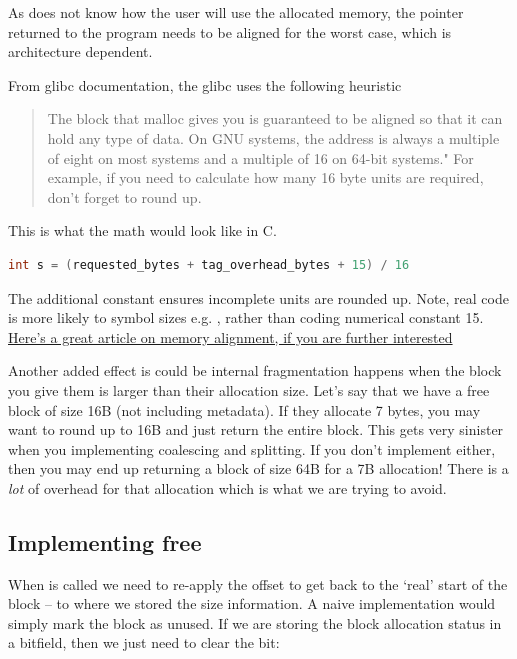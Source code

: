 As  does not know how the user will use the allocated memory, the pointer returned to the program needs to be aligned for the worst case, which is architecture dependent.

From glibc documentation, the glibc  uses the following heuristic \cite{vma_paging}

\begin{quote}
The block that malloc gives you is guaranteed to be aligned so that it can hold any type of data. On GNU systems, the address is always a multiple of eight on most systems and a multiple of 16 on 64-bit systems." For example, if you need to calculate how many 16 byte units are required, don't forget to round up.
\end{quote}

This is what the math would look like in C.

\begin{lstlisting}[language=C]
int s = (requested_bytes + tag_overhead_bytes + 15) / 16
\end{lstlisting}

The additional constant ensures incomplete units are rounded up. Note, real code is more likely to symbol sizes e.g. , rather than coding numerical constant 15.
\href{http://www.ibm.com/developerworks/library/pa-dalign/}{Here's a great article on memory alignment, if you are further interested}

Another added effect is could be internal fragmentation happens when the block you give them is larger than their allocation size.
Let's say that we have a free block of size 16B (not including metadata).
If they allocate 7 bytes, you may want to round up to 16B and just return the entire block.
This gets very sinister when you implementing coalescing and splitting.
If you don't implement either, then you may end up returning a block of size 64B for a 7B allocation!
There is a \emph{lot} of overhead for that allocation which is what we are trying to avoid.

\subsection{Implementing free}

When  is called we need to re-apply the offset to get back to the `real' start of the block -- to where we stored the size information.
A naive implementation would simply mark the block as unused.
If we are storing the block allocation status in a bitfield, then we just need to clear the bit:

